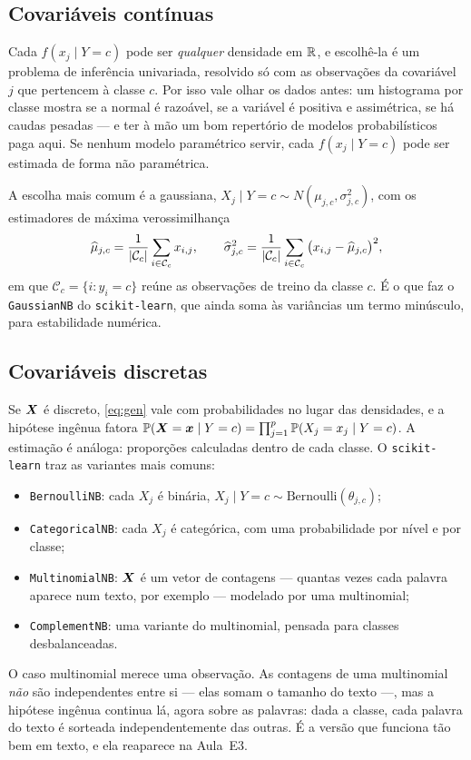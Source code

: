 \documentclass[11pt,a4paper]{article}
\begin{document}
\subsection{Covariáveis contínuas}
Cada $f(x_j\mid Y=c)$ pode ser \emph{qualquer} densidade em $\mathbb{R}$, e escolhê-la é um
problema de inferência univariada, resolvido só com as observações da covariável $j$
que pertencem à classe $c$. Por isso vale olhar os dados antes: um histograma por
classe mostra se a normal é razoável, se a variável é positiva e assimétrica, se há
caudas pesadas --- e ter à mão um bom repertório de modelos probabilísticos paga
aqui. Se nenhum modelo paramétrico servir, cada $f(x_j\mid Y=c)$ pode ser estimada
de forma não paramétrica.

A escolha mais comum é a gaussiana, $X_j\mid Y=c \sim N(\mu_{j,c},\sigma^2_{j,c})$,
com os estimadores de máxima verossimilhança
\[
  \widehat\mu_{j,c} = \frac{1}{\left\lvert \mathcal{C}_c \right\rvert}\sum_{i\in\mathcal{C}_c} x_{i,j},
  \qquad
  \widehat\sigma^2_{j,c} = \frac{1}{\left\lvert \mathcal{C}_c \right\rvert}\sum_{i\in\mathcal{C}_c}
    \big(x_{i,j}-\widehat\mu_{j,c}\big)^2,
\]
em que $\mathcal{C}_c=\{i: y_i=c\}$ reúne as observações de treino da classe $c$.
É o que faz o \texttt{GaussianNB} do \texttt{scikit-learn}, que ainda soma às
variâncias um termo minúsculo, para estabilidade numérica.

\subsection{Covariáveis discretas}
Se $\bm{X}$ é discreto, \eqref{eq:gen} vale com probabilidades no lugar das densidades, e
a hipótese ingênua fatora
$\mathbb{P}(\bm{X}=\bm{x}\mid Y=c)=\prod_{j=1}^p\mathbb{P}(X_j=x_j\mid Y=c)$. A estimação é análoga:
proporções calculadas dentro de cada classe. O \texttt{scikit-learn} traz as
variantes mais comuns:
\begin{itemize}[leftmargin=1.4cm,nosep]
  \item \texttt{BernoulliNB}: cada $X_j$ é binária,
        $X_j\mid Y=c\sim\text{Bernoulli}(\theta_{j,c})$;
  \item \texttt{CategoricalNB}: cada $X_j$ é categórica, com uma probabilidade por
        nível e por classe;
  \item \texttt{MultinomialNB}: $\bm{X}$ é um vetor de contagens --- quantas vezes cada
        palavra aparece num texto, por exemplo --- modelado por uma multinomial;
  \item \texttt{ComplementNB}: uma variante do multinomial, pensada para classes
        desbalanceadas.
\end{itemize}
O caso multinomial merece uma observação. As contagens de uma multinomial
\emph{não} são independentes entre si --- elas somam o tamanho do texto ---, mas a
hipótese ingênua continua lá, agora sobre as palavras: dada a classe, cada palavra
do texto é sorteada independentemente das outras. É a versão que funciona tão bem em
texto, e ela reaparece na Aula~E3.
\end{document}
